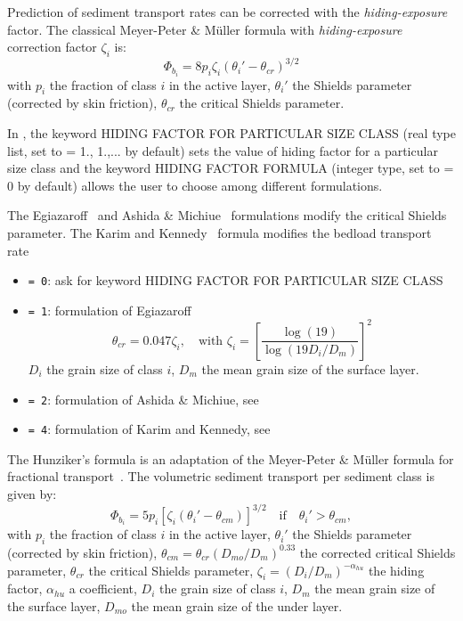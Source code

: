 Prediction of sediment transport rates can be corrected with the \emph{hiding-exposure} factor. The classical Meyer-Peter \& M\"uller formula with \emph{hiding-exposure} correction factor $\zeta_i$ is:
\begin{equation}\label{eq:MPMhiding}
\Phi_{b_i}  = 8 p_i \zeta_i\left( \theta_i' -\theta_{cr} \right)^{3/2} 
\end{equation}
with $p_i$ the fraction of class $i$ in the active layer, $\theta_i'$ the Shields parameter (corrected by skin friction), $\theta_{cr}$ the critical Shields parameter.

In \sisyphe{}, the keyword {\ttfamily HIDING FACTOR FOR PARTICULAR SIZE CLASS} (real type list, set to {\ttfamily = 1., 1.,...} by default) sets the value of hiding factor for a particular size class and the keyword {\ttfamily HIDING FACTOR FORMULA} (integer type, set to {\ttfamily = 0} by default) allows the user to choose among different formulations. 

The Egiazaroff~\cite{Egiazaroff} and Ashida \& Michiue~\cite{Ashida} formulations modify the critical Shields parameter. The Karim and Kennedy~\cite{Karim} formula modifies the bedload transport rate
\begin{itemize}
\item \texttt{= 0}: ask for keyword {\ttfamily HIDING FACTOR FOR PARTICULAR SIZE CLASS}
\item \texttt{= 1}: formulation of Egiazaroff 
  \begin{equation*}
 \theta_{cr} = 0.047\zeta_i,\quad\text{with}\,\, \zeta_i = \left[\frac{\log (19)}{\log (19 D_i /D_m)} \right]^2 
\end{equation*}
$D_i$ the grain size of class $i$, $D_m$ the mean grain size of the surface layer.
\item \texttt{= 2}: formulation of Ashida \& Michiue, see~\cite{Ashida}

\item \texttt{= 4}: formulation of Karim and Kennedy, see~\cite{Karim}

\end{itemize}

The Hunziker's formula is an adaptation of the Meyer-Peter \& M\"{u}ller formula for fractional transport~\cite{Hunziker}. The volumetric sediment transport per sediment class is given by:
\begin{equation}\label{eq:Hunziker}
\Phi_{b_i}  = 5 p_i \left[\zeta_i\left( \theta_i' -\theta_{cm} \right) \right]^{3/2} \quad\text{if}\quad \theta_i' > \theta_{cm}, 
\end{equation}
with $p_i$ the fraction of class $i$ in the active layer, $\theta_i'$ the Shields parameter (corrected by skin friction), 
$\theta_{cm} = \theta_{cr}\left(D_{mo}/D_m\right)^{0.33}$ the corrected critical Shields parameter, $\theta_{cr}$ the critical Shields parameter, $\zeta_{i} =\left(D_i/D_m\right)^{-\alpha_{hu}}$ the hiding factor, $\alpha_{hu}$ a coefficient, $D_i$ the grain size of class $i$, $D_m$ the mean grain size of the surface layer, $D_{mo}$ the mean grain size of the under layer.

